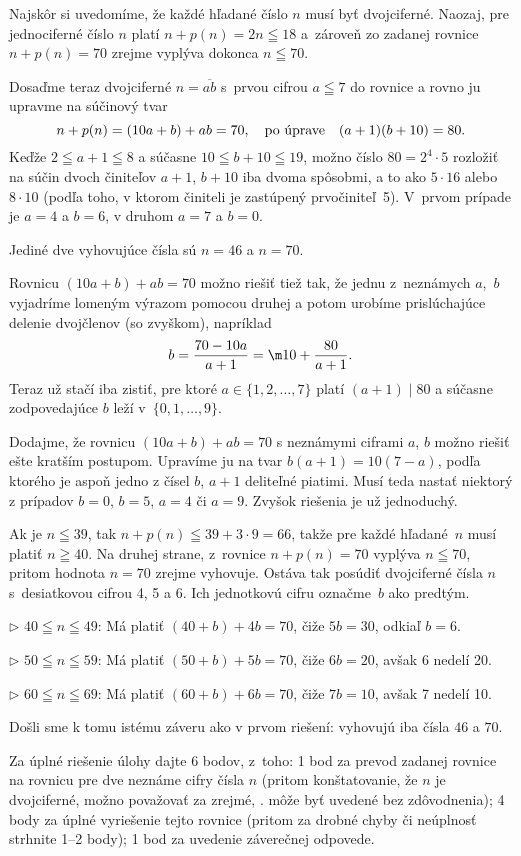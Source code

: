 {%
Najskôr si uvedomíme, že každé hľadané číslo $n$ musí byť
dvojciferné. Naozaj, pre jednociferné číslo $n$ platí
$n+p(n)=2n\leqq18$ a~zároveň zo zadanej rovnice $n+p(n)=70$ zrejme
vyplýva dokonca $n\leqq70$.

Dosaďme teraz dvojciferné $n=\overline{ab}$ s~prvou cifrou
$a\leqq7$ do rovnice a rovno ju upravme na súčinový tvar
$$
n+p(n)=(10a+b)+ab=70,\quad\hbox{po úprave}\quad
(a+1)(b+10)=80.
$$
Keďže $2\leqq a+1\leqq 8$ a súčasne $10\leqq b+10\leqq19$, možno
číslo $80=2^4\cdot5$ rozložiť na súčin dvoch činiteľov
$a+1$, $b+10$ iba dvoma spôsobmi, a to ako $5\cdot16$ alebo
$8\cdot10$ (podľa toho, v ktorom činiteli je zastúpený
prvočiniteľ~5).
V~prvom prípade je $a=4$ a $b=6$, v druhom $a=7$ a $b=0$.

\Zav Jediné dve vyhovujúce čísla sú $n=46$ a $n=70$.

\Pozn
Rovnicu $(10a+b)+ab=70$ možno riešiť tiež tak, že jednu
z~neznámych $a$,~$b$ vyjadríme lomeným
výrazom pomocou druhej a potom urobíme prislúchajúce delenie dvojčlenov
(so zvyškom), napríklad
$$
b=\frac{70-10a}{a+1}=\m10+\frac{80}{a+1}.
$$
Teraz už stačí iba zistiť, pre ktoré $a\in\{1,2,\dots,7\}$ platí
$(a+1)\mid 80$ a súčasne zodpovedajúce $b$ leží v~$\{0,1,\dots,9\}$.

Dodajme, že rovnicu $(10a+b)+ab=70$ s neznámymi ciframi
$a$, $b$ možno riešiť ešte kratším postupom. Upravíme ju na tvar
$b(a+1)=10(7-a)$, podľa ktorého je aspoň jedno z čísel $b$, $a+1$
deliteľné piatimi. Musí teda nastať niektorý z prípadov $b=0$, $b=5$,
$a=4$ či $a=9$. Zvyšok riešenia je už jednoduchý.

\Jres
Ak je $n\leqq39$, tak $n+p(n)\leqq39+3\cdot9=66$, takže pre každé
hľadané~$n$ musí platiť $n\geqq40$. Na druhej strane, z~rovnice
$n+p(n)=70$ vyplýva $n\leqq70$, pritom hodnota $n=70$ zrejme
vyhovuje. Ostáva tak posúdiť dvojciferné čísla $n$
s~desiatkovou cifrou 4, 5 a 6.
Ich jednotkovú cifru označme~$b$ ako predtým.
\item{$\triangleright$} $40\leqq n\leqq49$: Má platiť $(40+b)+4b=70$, čiže $5b=30$, odkiaľ $b=6$.
\item{$\triangleright$} $50\leqq n\leqq59$: Má platiť $(50+b)+5b=70$, čiže
$6b=20$, avšak $6$ nedelí 20.
\item{$\triangleright$} $60\leqq n\leqq69$: Má platiť $(60+b)+6b=70$, čiže
$7b=10$, avšak 7 nedelí 10.

\noindent
Došli sme k tomu istému záveru ako v prvom riešení:
vyhovujú iba čísla $46$ a $70$.


\schemaABC
Za úplné riešenie úlohy dajte 6 bodov, z~toho: 1 bod za prevod zadanej
rovnice na rovnicu pre dve neznáme cifry čísla $n$ (pritom
konštatovanie, že $n$ je dvojciferné, možno považovať za zrejmé, \tj.
môže byť uvedené bez zdôvodnenia); 4 body za úplné vyriešenie tejto
rovnice (pritom za drobné chyby či neúplnosť strhnite 1--2 body);
1 bod za uvedenie záverečnej odpovede.

}
